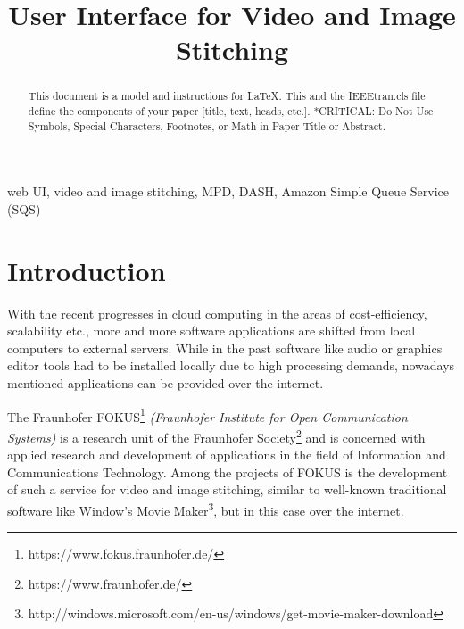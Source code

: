 \documentclass[conference]{IEEEtran}
\begin{document}
\title{User Interface for Video and Image Stitching}

\author{
\and
{}
\and
{}
}

\maketitle

\begin{abstract}
This document is a model and instructions for \LaTeX.
This and the IEEEtran.cls file define the components of your paper [title, text, heads, etc.]. *CRITICAL: Do Not Use Symbols, Special Characters, Footnotes, 
or Math in Paper Title or Abstract.
\end{abstract}

\begin{IEEEkeywords}
web UI, video and image stitching, MPD, DASH, Amazon Simple Queue Service (SQS)
\end{IEEEkeywords}

\section{Introduction}
With the recent progresses in cloud computing in the areas of cost-efficiency, scalability etc., more and more software applications are shifted from local computers to external servers.
While in the past software like audio or graphics editor tools had to be installed locally due to high processing demands, nowadays mentioned applications can be provided over the internet.

The Fraunhofer FOKUS\footnote{https://www.fokus.fraunhofer.de/} \textit{(Fraunhofer Institute for Open Communication Systems)} is a research unit of the Fraunhofer Society\footnote{https://www.fraunhofer.de/} and is concerned with applied research and development of applications in the field of Information and Communications Technology.
Among the projects of FOKUS is the development of such a service for video and image stitching, similar to well-known traditional software like Window's Movie Maker\footnote{http://windows.microsoft.com/en-us/windows/get-movie-maker-download}, but in this case over the internet.
\end{document}
